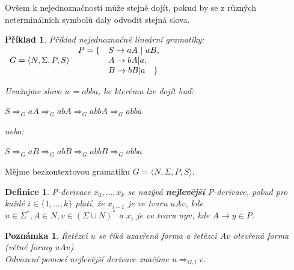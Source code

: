 \documentclass[10pt, a4paper, titlepage]{article}
\theoremstyle{note}
\newtheorem{definice}{Definice}
\newtheorem{priklad}{Příklad}
\newtheorem{poznamka}{Poznámka}
\begin{document}
Ovšem k nejednoznačnosti může stejně dojít, pokud by se z různých neterminálních symbolů daly odvodit stejná slova.

\begin{priklad}
Příklad nejednoznačné lineární gramatiky: \\
$\begin{array}{l}
G=\langle N,\Sigma,P,S \rangle \\
\end{array}\\
\begin{array}{l l}
P= \lbrace &S \rightarrow aA\ |\ aB, \\
& A \rightarrow bA|a, \\
& B \rightarrow bB|a \quad \rbrace
\end{array}
$

Uvažujme slovo $w=abba$, ke kterému lze dojít buď:

$S \Rightarrow_G aA \Rightarrow_G abA \Rightarrow_G abbA \Rightarrow_G abba$

nebo:

$S \Rightarrow_G aB \Rightarrow_G abB \Rightarrow_G abbB \Rightarrow_G abba$
\end{priklad}

Mějme bezkontextovou gramatiku $G = \langle N,\Sigma,P,S \rangle$.

\begin{definice}
P-derivace $x_0,\ldots,x_k$ se nazývá \textbf{nejlevější} P-derivace, pokud pro každé $i \in \lbrace 1,\ldots,k \rbrace$ platí, že $x_{i-1}$ je ve tvaru $uAv$, kde $u \in \Sigma^*,A\in N,v \in (\Sigma \cup N)^*$ a $x_i$ je ve tvaru $uyv$, kde $A \rightarrow y \in P$.
\end{definice}

\begin{poznamka}
Řetězci $u$ se říká uzavřená forma a řetězci $Av$ otevřená forma (větné formy $uAv$).\\
Odvození pomocí nejlevější derivace značíme $u \Rightarrow_{G,l} v$.
\end{poznamka}
\end{document}
